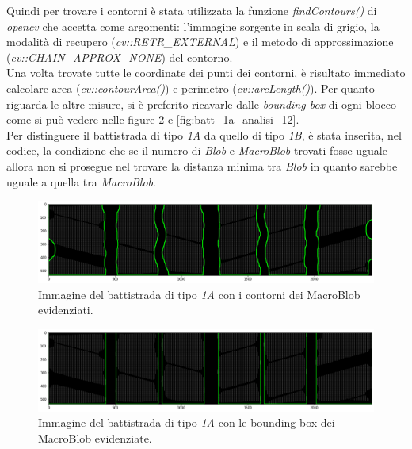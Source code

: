 \noindent Quindi per trovare i contorni è stata utilizzata la funzione \textit{findContours()} di \textit{opencv} che accetta come argomenti: l'immagine sorgente in scala di grigio, la modalità di recupero (\textit{cv::RETR\_EXTERNAL}) e il metodo di approssimazione (\textit{cv::CHAIN\_APPROX\_NONE}) del contorno.\\
\newline
Una volta trovate tutte le coordinate dei punti dei contorni, è risultato immediato calcolare area (\textit{cv::contourArea()}) e perimetro (\textit{cv::arcLength()}). Per quanto riguarda le altre misure, si è preferito ricavarle dalle \textit{bounding box} di ogni blocco come si può vedere nelle figure \ref{fig:batt_1a_analisi_10} e \ref{fig:batt_1a_analisi_12}.\\
\newline
Per distinguere il battistrada di tipo \textit{1A} da quello di tipo \textit{1B}, è stata inserita, nel codice, la condizione che se il numero di \textit{Blob} e \textit{MacroBlob} trovati fosse uguale allora non si prosegue nel trovare la distanza minima tra \textit{Blob} in quanto sarebbe uguale a quella tra \textit{MacroBlob}.

\begin{figure}[H]
	\centering
	\includegraphics[width=0.9\columnwidth]{./pictures/batt_1a_analisi_9.png}
	\caption{Immagine del battistrada di tipo \textit{1A} con i contorni dei MacroBlob evidenziati.}\label{fig:batt_1a_analisi_9}
\end{figure}

\begin{figure}[H]
	\centering
	\includegraphics[width=0.9\columnwidth]{./pictures/batt_1a_analisi_10.png}
	\caption{Immagine del battistrada di tipo \textit{1A} con le bounding box dei MacroBlob evidenziate.}\label{fig:batt_1a_analisi_10}
\end{figure}

